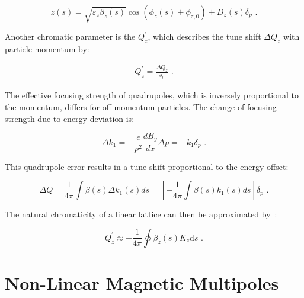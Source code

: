 \begin{equation}
    z(s) = \sqrt{\varepsilon_z \beta_z(s)} \cos \left( \phi_z(s) + \phi_{z, 0} \right) + D_z(s) \delta_p \text{ .}
    \label{equation:hill_solution_with_dispersion}
\end{equation}

Another chromatic parameter is the  \(Q_z^{\prime}\), which describes the tune shift \(\Delta Q_z\) with particle momentum by:

\begin{eqnarray}
    Q^{\prime}_z = \frac{\Delta Q_z}{\delta_p} \text{ .}
    \label{equation:chromaticity_definition}
\end{eqnarray}

The effective focusing strength of quadrupoles, which is inversely proportional to the momentum, differs for off-momentum particles.
The change of focusing strength due to energy deviation is:

\begin{equation}
	\Delta k_{1} = - \dfrac{e}{p^2} \dfrac{d B_{y}}{d x} \Delta p = -k_{1} \delta_p \text{ .}
    \label{equation:quadrupole_focusing_strength_deviation_from_dispersion}
\end{equation}

This quadrupole error results in a tune shift proportional to the energy offset:

\begin{equation}
	\Delta Q = \dfrac{1}{4 \pi} \int \beta(s) \Delta k_{1}(s) ds = \left[ - \frac{1}{4 \pi} \int \beta(s) k_{1}(s) ds \right] \delta_p \text{ .}
    \label{equation:tune_shift_from_dispersion}
\end{equation}

The natural chromaticity of a linear lattice can then be approximated by~\cite{CAS:Guiducci:Chromaticity}:

\begin{equation}
    Q_z^{\prime} \approx -\frac{1}{4 \pi} \oint \beta_z(s) K_z \mathrm{d}s \text{ .}
    \label{equation:natural_chromaticity_approximation}
\end{equation}


\section{Non-Linear Magnetic Multipoles}
\label{section:non_linear_magnetic_multipoles}

